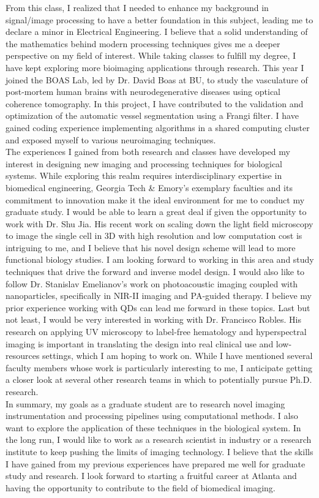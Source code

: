 \documentclass[12pt]{article}
\begin{document}
From this class, I realized that I needed to enhance my background in signal/image processing to have a better foundation in this subject, leading me to declare a minor in Electrical Engineering. I believe that a solid understanding of the mathematics behind modern processing techniques gives me a deeper perspective on my field of interest. While taking classes to fulfill my degree, I have kept exploring more bioimaging applications through research. This year I joined the BOAS Lab, led by Dr. David Boas at BU, to study the vasculature of post-mortem human brains with neurodegenerative diseases using optical coherence tomography. In this project, I have contributed to the validation and optimization of the automatic vessel segmentation using a Frangi filter. I have gained coding experience implementing algorithms in a shared computing cluster and exposed myself to various neuroimaging techniques. 
\\

The experiences I gained from both research and classes have developed my interest in designing new imaging and processing techniques for biological systems. While exploring this realm requires interdisciplinary expertise in biomedical engineering, Georgia Tech \& Emory's exemplary faculties and its commitment to innovation make it the ideal environment for me to conduct my graduate study. I would be able to learn a great deal if given the opportunity to work with Dr. Shu Jia. His recent work on scaling down the light field microscopy to image the single cell in 3D with high resolution and low computation cost is intriguing to me, and I believe that his novel design scheme will lead to more functional biology studies. I am looking forward to working in this area and study techniques that drive the forward and inverse model design. I would also like to follow Dr. Stanislav Emelianov's work on photoacoustic imaging coupled with nanoparticles, specifically in NIR-II imaging and PA-guided therapy. I believe my prior experience working with QDs can lead me forward in these topics. Last but not least, I would be very interested in working with Dr. Francisco Robles. His research on applying UV microscopy to label-free hematology and hyperspectral imaging is important in translating the design into real clinical use and low-resources settings, which I am hoping to work on. While I have mentioned several faculty members whose work is particularly interesting to me, I anticipate getting a closer look at several other research teams in which to potentially pursue Ph.D. research.
\\

In summary, my goals as a graduate student are to research novel imaging instrumentation and processing pipelines using computational methods. I also want to explore the application of these techniques in the biological system. In the long run, I would like to work as a research scientist in industry or a research institute to keep pushing the limits of imaging technology. I believe that the skills I have gained from my previous experiences have prepared me well for graduate study and research. I look forward to starting a fruitful career at Atlanta and having the opportunity to contribute to the field of biomedical imaging.
\\
\end{document}
